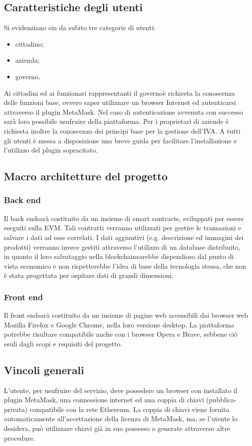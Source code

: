 \subsection{Caratteristiche degli utenti}
Si evidenziano sin da subito tre categorie di utenti:
\begin{itemize}
	\item cittadino;
	\item azienda;
	\item governo\glo.
\end{itemize}
Ai cittadini ed ai funzionari rappresentanti il governo\glosp è richiesta la conoscenza delle funzioni base, ovvero saper utilizzare un browser Internet ed autenticarsi attraverso il plugin MetaMask\glo. Nel caso di autenticazione avvenuta con successo sarà loro possibile usufruire  della piattaforma. Per i proprietari di aziende è richiesta inoltre la conoscenza dei principi base per la gestione dell'IVA. A tutti gli utenti è messa a disposizione una breve guida per facilitare l'installazione e l'utilizzo del plugin sopracitato. 

\subsection{Macro architetture del progetto}
\subsubsection{Back end}
Il back end\glosp sarà costituito da un insieme di smart contracts\glo, sviluppati per essere eseguiti sulla EVM\glo. Tali contratti verranno utilizzati per gestire le transazioni e salvare i dati ad esse correlati. I dati aggiuntivi (e.g. descrizione ed immagini dei prodotti) verranno invece gestiti attraverso l'utilizzo di un database distribuito, in quanto il loro salvataggio nella blockchain\glosp sarebbe dispendioso dal punto di vista economico e non rispetterebbe l'idea di base della tecnologia stessa, che non è stata progettata per ospitare dati di grandi dimensioni.

\subsubsection{Front end}
Il front end\glosp sarà costituito da un insieme di pagine web accessibili dai browser web Mozilla Firefox e Google Chrome, nella loro versione desktop. La piattaforma potrebbe risultare compatibile anche con i browser Opera e Brave, sebbene ciò esuli dagli scopi e requisiti del progetto.

\subsection{Vincoli generali}
L’utente, per usufruire del servizio, deve possedere un browser con installato il plugin MetaMask\glo, una connessione internet ed una coppia di chiavi (pubblica-privata) compatibile con la rete Ethereum\glo. La coppia di chiavi viene fornita automaticamente all'accettazione della licenza di MetaMask\glo, ma, se l’utente lo desidera, può utilizzare chiavi già in suo possesso o generate attraverso altre procedure.

 
